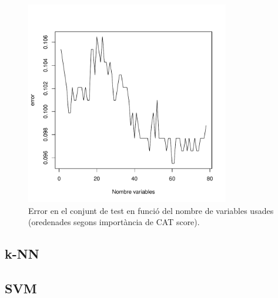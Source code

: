 \documentclass[a4paper,10pt]{article}
\begin{document}
\begin{figure}
\centering
\includegraphics[width=3.5in]{memoria-lda_var_selec}
\caption{Error en el conjunt de test en funció del nombre de variables usades (oredenades segons importància de CAT score).} \label{fig:lda_var_selec}
\end{figure}


\subsection{k-NN}
\subsection{SVM}

\end{document}
